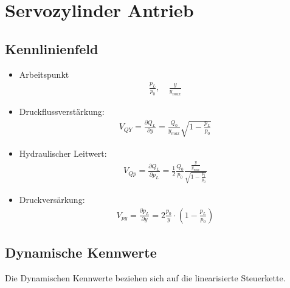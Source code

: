 \section{Servozylinder Antrieb}



\subsection{Kennlinienfeld}
\begin{itemize}
\item Arbeitspunkt
\begin{align*}
\frac{p_L}{p_0}, \quad \frac{y}{y_{max}}
\end{align*}
\item Druckflussverstärkung:
\begin{align*}
V_{QY} = 
\frac{\partial Q_L}{\partial y} = \frac{Q_0}{y_{max}} \sqrt{1-\frac{p_L}{p_0}}
\end{align*}
\item Hydraulischer Leitwert:
\begin{align*}
V_{Qp} = \frac{\partial Q_L}{\partial p_L} = \frac{1}{2} \frac{Q_0}{p_0} \frac{\frac{y}{y_{max}}}{\sqrt{1-\frac{p_l}{p_0}}}
\end{align*}
\item Druckversärkung:
\begin{align*}
V_{py} = \frac{\partial p_L}{\partial y} = 2 \frac{p_0}{y} \cdot \left(1-\frac{p_L}{p_0} \right)
\end{align*}
\end{itemize}



\subsection{Dynamische Kennwerte}
Die Dynamischen Kennwerte beziehen sich auf die linearisierte Steuerkette.


